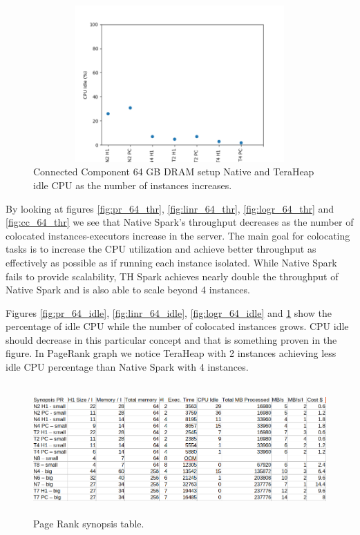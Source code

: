 \documentclass[twocolumn,10pt]{asme2e}
\begin{document}
\begin{figure}[h!]
        \includegraphics[width=13cm,height=6cm]{CC_64.png}
	\caption{Connected Component 64 GB DRAM setup Native and TeraHeap idle CPU as the number of instances increases.}
	\label{fig:cc_64_idle}
\end{figure}

By looking at figures \ref{fig:pr_64_thr}, \ref{fig:linr_64_thr}, \ref{fig:logr_64_thr} and \ref{fig:cc_64_thr} we see that Native Spark's throughput decreases as the number of colocated instances-executors increase in the server. The main goal for colocating tasks is to increase the CPU utilization and achieve better throughput as effectively as possible as if running each instance isolated. While Native Spark fails to provide scalability, TH Spark achieves nearly double the throughput of Native Spark and is also able to scale beyond 4 instances.

Figures \ref{fig:pr_64_idle}, \ref{fig:linr_64_idle}, \ref{fig:logr_64_idle} and \ref{fig:cc_64_idle}  show the percentage of idle CPU while the number of colocated instances grows. CPU idle should decrease in this particular concept and that is something proven in the figure. In PageRank graph we notice TeraHeap with 2 instances achieving less idle CPU percentage than Native Spark with 4 instances.
\begin{figure}[h!]
        \includegraphics[width=18cm,height=5cm]{pr_table.png}
	\caption{Page Rank synopsis table.}
	\label{fig:pr_table}
\end{figure}
\end{document}
